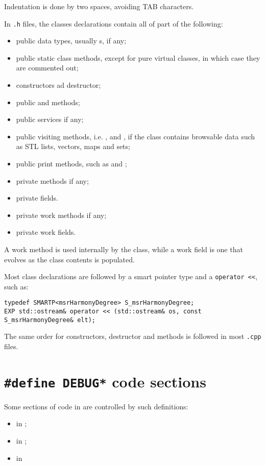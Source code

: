 Indentation is done by two spaces, avoiding TAB characters.

In {\tt *.h} files, the classes declarations contain all of part of the following:
\begin{itemize}
\item public data types, usually \enumType s, if any;
\item public static class    methods, except for pure virtual classes, in which case they are commented out;
\item constructors ad destructor;
\item public  and  methods;
\item public services if any;
\item public visiting methods, i.e. ,  and , if the class   contains browsable data such as STL lists, vectors, maps and sets;
\item public print methods, such as  and ;
\item private methods if any;
\item private fields.
\item private work methods if any;%
\item private work fields.
\end{itemize}

A work method is used internally by the class, while a work field is one that evolves as the class   contents is populated.

Most class   declarations are followed by a smart pointer type and a {\tt operator <<}, such as:
\begin{lstlisting}[language=CPlusPlus]
typedef SMARTP<msrHarmonyDegree> S_msrHarmonyDegree;
EXP std::ostream& operator << (std::ostream& os, const S_msrHarmonyDegree& elt);
\end{lstlisting}

The same order for constructors, destructor and methods is followed in most {\tt .cpp} files.


\section{{\tt \#define DEBUG*} code sections}

Some sections of code in  are controlled by such definitions:
\begin{itemize}
\item {} in ;
\item {} in ;
\item {} in 
\end{itemize}

